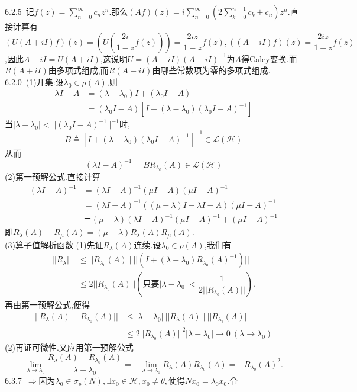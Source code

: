 \documentclass[b5paper]{ctexart}
\begin{document}
\pagestyle{plain}
\noindent
{}
6.2.5~记$f(z)=\sum\limits_{n=0}^{\infty}c_nz^n$.那么$(Af)(z)=i\sum\limits_{n=0}^{\infty}(2\sum\limits_{k=0}^{n-1}c_k+c_n)z^n$.直接计算有$(U(A+iI)f)(z)=\left( U\left( \dfrac{2i}{1-z}f(z)\right) \right)=\dfrac{2iz}{1-z}f(z),((A-iI)f)(z)=\dfrac{2iz}{1-z}f(z) $,因此$A-iI=U(A+iI)$,这说明$U=(A-iI)(A+iI)^{-1}$为$A$得Caley变换.而$R(A+iI)$由多项式组成,而$R(A-iI)$由哪些常数项为零的多项式组成.\\
6.2.0~(1)开集:设$\lambda_0\in\rho(A)$,则
\[\begin{array}{rl}
\lambda I-A&=(\lambda-\lambda_0)I+(\lambda_0I-A)\\
&=(\lambda_0I-A)[I+(\lambda-\lambda_0)(\lambda_0I-A)^{-1}]
\end{array}\]
当$|\lambda-\lambda_0|<||(\lambda_0I-A)^{-1}||^{-1}$时,\[B\triangleq [I+(\lambda-\lambda_0)(\lambda_0I-A)^{-1}]^{-1}\in \mathscr{L}(\mathscr{H})\]
从而
\[(\lambda I-A)^{-1}=BR_{\lambda_0}(A)\in \mathscr{L}(\mathscr{H})\]
(2)第一预解公式.直接计算
\[\begin{array}{rl}
(\lambda I-A)^{-1} &=(\lambda I-A)^{-1}(\mu I-A)(\mu I-A)^{-1}\\
& =(\lambda I-A)^{-1}((\mu-\lambda)I+\lambda I-A)(\mu I-A)^{-1}\\
&　＝(\mu-\lambda)(\lambda I-A)^{-1}(\mu I-A)^{-1}+(\mu I-A)^{-1}
\end{array}\]
即$R_{\lambda}(A)-R_{\mu}(A)=(\mu-\lambda)R_{\lambda}(A)R_{\mu}(A).$\\
(3)算子值解析函数
(1)先证$R_{\lambda}(A)$连续.设$\lambda_0\in\rho(A)$,我们有
\[\begin{array}{rl}
||R_{\lambda}||&\leq ||R_{\lambda_0}(A)||~||(I+(\lambda-\lambda_0)R_{\lambda_0}(A)^{-1}
)||\\
&\leq 2||R_{\lambda_0}(A)||\left( \text{只要}|\lambda-\lambda_0|<\dfrac{1}{2||R_{\lambda_0}(A)||}\right). 
\end{array}\]
再由第一预解公式,便得
\[\begin{array}{rl}
||R_{\lambda}(A)-R_{\lambda_0}(A)||& \leq |\lambda-\lambda_0|~||R_{\lambda}(A)||~||R_{\lambda_)}(A)||\\
& \leq 2||R_{\lambda_0}(A)||^2|\lambda-\lambda_0|\to 0~(\lambda\to \lambda_0)
\end{array}\]
(2)再证可微性.又应用第一预解公式
\[\lim_{\lambda\to \lambda_0}\dfrac{R_{\lambda}(A)-R_{\lambda_0}(A)}{\lambda-\lambda_0}=-\lim_{\lambda\to\lambda_0}R_{\lambda}(A)R_{\lambda_0}(A)=-R_{\lambda_0}(A)^2.\]
6.3.7~$\Rightarrow$因为$\lambda_0\in\sigma_p(N),\exists x_0\in \mathscr{H},x_0\neq \theta,$使得$Nx_0=\lambda_0x_0.$令
\end{document}
